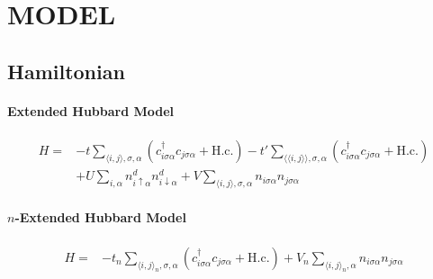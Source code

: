 \documentclass{article}
\begin{document}
	\section{MODEL}
	\subsection{Hamiltonian}
	\paragraph{Extended Hubbard Model}
	\begin{equation}
		\begin{aligned}
			H =& -t\sum_{\langle i,j \rangle ,\sigma,\alpha}\left(c^\dagger_{i\sigma\alpha}c_{j\sigma\alpha} + \text{H.c.}\right) 
			- t'\sum_{\langle\langle i,j\rangle\rangle,\sigma,\alpha}\left(c^\dagger_{i\sigma\alpha}c_{j\sigma\alpha} + \text{H.c.}\right)
			\\ &+U\sum_{i,\alpha}n^d_{i\uparrow\alpha}n^d_{i\downarrow\alpha} 
			+ V\sum_{\langle i,j \rangle,\sigma,\alpha}n_{i\sigma\alpha}n_{j\sigma\alpha}
		\end{aligned}
	\end{equation}
	\paragraph{$n$-Extended Hubbard Model}
	\begin{equation}
		\begin{aligned}
		H =& -t_n\sum_{\langle i,j \rangle_n,\sigma,\alpha}\left(c^\dagger_{i\sigma\alpha}c_{j\sigma\alpha} + \text{H.c.}\right) 
+V_n\sum_{\langle i,j \rangle_n,\alpha}n_{i\sigma\alpha}n_{j\sigma\alpha}
		\end{aligned}
	\end{equation}
\end{document}
